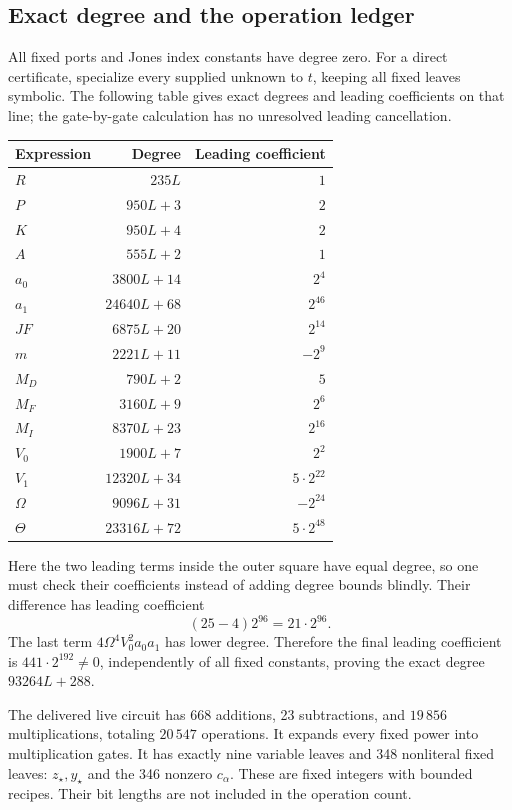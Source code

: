 \subsection{Exact degree and the operation ledger}

All fixed ports and Jones index constants have degree zero. For a direct
certificate, specialize every supplied unknown to $t$, keeping all fixed
leaves symbolic. The following table gives exact degrees and leading
coefficients on that line; the gate-by-gate calculation has no unresolved
leading cancellation.
\begin{center}
\small
\begin{tabular}{@{}lrr@{}}
\toprule Expression&Degree&Leading coefficient\\\midrule
$R$&$235L$&$1$\\
$P$&$950L+3$&$2$\\
$K$&$950L+4$&$2$\\
$A$&$555L+2$&$1$\\
$a_0$&$3800L+14$&$2^4$\\
$a_1$&$24640L+68$&$2^{46}$\\
$JF$&$6875L+20$&$2^{14}$\\
$m$&$2221L+11$&$-2^9$\\
$M_D$&$790L+2$&$5$\\
$M_F$&$3160L+9$&$2^6$\\
$M_I$&$8370L+23$&$2^{16}$\\
$V_0$&$1900L+7$&$2^2$\\
$V_1$&$12320L+34$&$5\cdot2^{22}$\\
$\Omega$&$9096L+31$&$-2^{24}$\\
$\Theta$&$23316L+72$&$5\cdot2^{48}$\\
\bottomrule
\end{tabular}
\end{center}
Here the two leading terms inside the outer square have equal degree,
so one must check their coefficients instead of adding degree bounds
blindly. Their difference has leading coefficient
\[
 (25-4)2^{96}=21\cdot2^{96}.
\]
The last term $4\Omega^4V_0^2a_0a_1$ has lower degree. Therefore the
final leading coefficient is $441\cdot2^{192}\ne0$, independently of
all fixed constants, proving the exact degree $93264L+288$.

The delivered live circuit has 668 additions, 23 subtractions, and
$19\,856$ multiplications, totaling $20\,547$ operations. It expands
every fixed power into multiplication gates. It has exactly nine
variable leaves and 348 nonliteral fixed leaves: $z_\star,y_\star$ and
the 346 nonzero $c_\alpha$. These are fixed integers with bounded
recipes. Their bit lengths are not included in the operation count.

